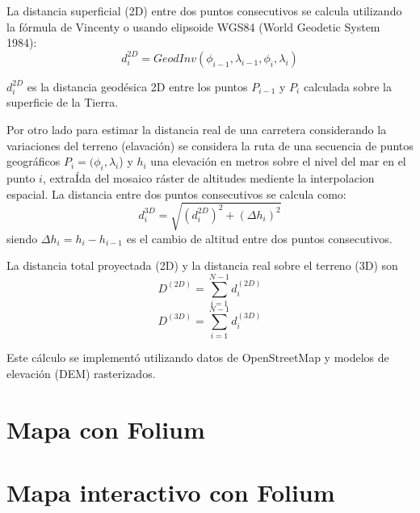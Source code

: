 \documentclass[
  letterpaper,
  DIV=11,
  numbers=noendperiod]{scrreprt}
\begin{document}
La distancia superficial (2D) entre dos puntos consecutivos se calcula
utilizando la fórmula de Vincenty o usando elipsoide WGS84 (World
Geodetic System 1984): \[
 d_i^{2D}= GeodInv(\phi_{i-1}, \lambda_{i-1}, \phi_i, \lambda_i)
 \]

\(d_i^{2D}\) es la distancia geodésica 2D entre los puntos \(P_{i-1}\) y
\(P_{i}\) calculada sobre la superficie de la Tierra.

Por otro lado para estimar la distancia real de una carretera
considerando la variaciones del terreno (elavación) se considera la ruta
de una secuencia de puntos geográficos \(P_i= (\phi_i, \lambda_i\)) y
\(h_i\) una elevación en metros sobre el nivel del mar en el punto
\(i\), extraÍda del mosaico ráster de altitudes mediente la
interpolacion espacial. La distancia entre dos puntos consecutivos se
calcula como: \[
d_i^{3D} = \sqrt{(d_i^{2D})^2+(\Delta h_i)^2}
\] siendo \(\Delta h_i= h_i-h_{i-1}\) es el cambio de altitud entre dos
puntos consecutivos.

La distancia total proyectada (2D) y la distancia real sobre el terreno
(3D) son \[
D^{(2D)}= \sum_{i=1}^{N-1} d_i^{(2D)}
\] \[
D^{(3D)}= \sum_{i=1}^{N-1} d_i^{(3D)}
\]

Este cálculo se implementó utilizando datos de OpenStreetMap y modelos
de elevación (DEM) rasterizados.


\chapter{}\label{section-2}


\chapter{Mapa con Folium}\label{mapa-con-folium}


\chapter{Mapa interactivo con Folium}\label{mapa-interactivo-con-folium}
\end{document}
